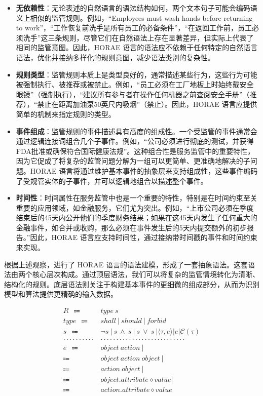 \begin{itemize}
    \item \textbf{无依赖性}：无论表述的自然语言的语法结构如何，两个文本句子可能会编码语义上相似的监管规则。例如，“Employees must wash hands before returning to work”，“工作恢复前洗手是所有员工的必备条件”，“在返回工作前，员工必须洗手”这三条规则，尽管它们在自然语法上存在显著差异，但实际上代表了相同的监管意图。因此，HORAE 语言的语法应不依赖于任何特定的自然语言语法，优化并接纳多样化的规则意图，减少语法类别的复杂性。
    \item \textbf{规则类型}：监管规则本质上是类型良好的，通常描述某些行为，这些行为可能被强制执行、被推荐或被禁止。例如，“员工必须在工厂地板上时始终戴安全眼镜”（强制执行），“建议所有参与者在操作任何机器之前查阅安全手册”（推荐），“禁止在距离加油泵50英尺内吸烟”（禁止）。因此，HORAE 语言应提供简单的机制来指定规则的类型。
    \item \textbf{事件组成}：监管规则的事件描述具有高度的组成性。一个受监管的事件通常会通过逻辑连接词组合几个子事件。例如，“公司必须进行彻底的测试，并获得FDA批准或确保符合国际健康法规”。这种组合性是服务监管中的重要特性，因为它促成了将复杂的监管问题分解为一组可以更简单、更准确地解决的子问题。HORAE 语言将通过维护基本事件的抽象层来支持组成性，这些事件编码了受规管实体的子事件，并可以逻辑地组合以描述整个事件。
    \item \textbf{时间性}：时间属性在服务监管中也是一个重要的特性，特别是在时间约束至关重要的应用领域，如金融服务，它们尤为突出。例如，“上市公司必须在季度结束后的45天内公开他们的季度财务结果；如果在这45天内发生了任何重大的金融事件，如合并或收购，那么必须在事件发生后的5天内提交额外的初步报告。”因此，HORAE 语言应支持时间性，通过接纳带时间戳的事件和时间约束来实现。
\end{itemize}

根据上述观察，进行了 HORAE 语言的语法建模，形成了一套抽象语法。这套语法由两个核心层次构成。通过顶层语法，我们可以将复杂的监管情境转化为清晰、结构化的规则。底层语法则关注于构建基本事件的更细微的组成部分，从而为识别模型和算法提供更精确的输入数据。


\begin{align*}
    R \ \  \Coloneqq \ \  & type~s\\
    type \ \  \Coloneqq \ \  & shall~|~should~|~forbid\\
    s \ \  \Coloneqq \ \  &  \neg s~|~s~ \land~ s ~|~s~ \lor~ s ~|
    \langle \tau, e \rangle | e | \mathcal{C}(\tau)\\
    \cdot \cdot \cdot \cdot\cdot\cdot\cdot\cdot\cdot\cdot & \cdot\cdot\cdot\cdot\cdot\cdot\cdot\cdot\cdot\cdot\cdot\cdot\cdot\cdot\cdot\cdot\cdot\cdot \cdot \cdot \cdot \cdot \cdot \cdot \cdot \cdot\cdot\\
    e \ \  \Coloneqq \ \  & object~action~|\\
    \Coloneqq \ \  & object~action~object~|\\
    \Coloneqq \ \  & action~object~|\\
    \Coloneqq \ \  & object. attribute \diamond value|\\
    \Coloneqq \ \  & action. attribute \diamond value\\
\end{align*}

